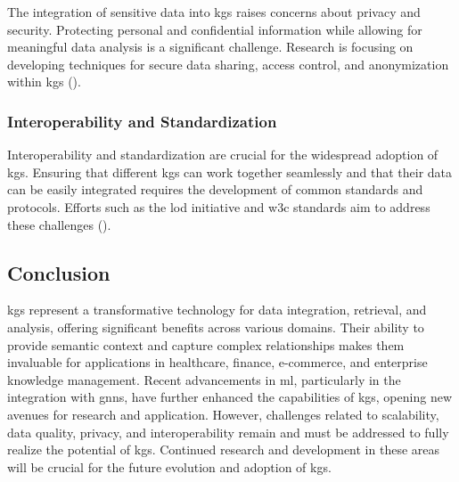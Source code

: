 The integration of sensitive data into \glspl{kg} raises concerns about privacy and security. Protecting personal and confidential information while allowing for meaningful data analysis is a significant challenge. Research is focusing on developing techniques for secure data sharing, access control, and anonymization within \glspl{kg} (\cite{Bonatti2017}).

\subsubsection*{Interoperability and Standardization}

Interoperability and standardization are crucial for the widespread adoption of \glspl{kg}. Ensuring that different \glspl{kg} can work together seamlessly and that their data can be easily integrated requires the development of common standards and protocols. Efforts such as the \gls{lod} initiative and \gls{w3c} standards aim to address these challenges (\cite{Bizer2023}).

\subsection*{Conclusion}
\glspl{kg} represent a transformative technology for data integration, retrieval, and analysis, offering significant benefits across various domains. Their ability to provide semantic context and capture complex relationships makes them invaluable for applications in healthcare, finance, e-commerce, and enterprise knowledge management. Recent advancements in \gls{ml}, particularly in the integration with \glspl{gnn}, have further enhanced the capabilities of \glspl{kg}, opening new avenues for research and application. However, challenges related to scalability, data quality, privacy, and interoperability remain and must be addressed to fully realize the potential of \glspl{kg}. Continued research and development in these areas will be crucial for the future evolution and adoption of \glspl{kg}.